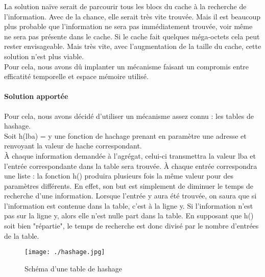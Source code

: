 \documentclass[a4paper,10pt]{article}
\begin{document}
La solution naïve serait de parcourir tous les blocs du cache à la recherche de l'information. Avec de la chance, elle serait très vite trouvée. Mais 
il est beaucoup plus probable que l'information ne sera pas immédiatement trouvée, voir même ne sera pas présente dans le cache. Si le cache fait quelques 
méga-octets cela peut rester envisageable. Mais très vite, avec l'augmentation de la taille du cache, cette solution n'est plus viable.\\
Pour cela, nous avons dû implanter un mécanisme faisant un compromis entre efficatité temporelle et espace mémoire utilisé. 

\paragraph{Solution apportée}
Pour cela, nous avons décidé d'utiliser un mécanisme assez connu : les tables de hashage.\\
Soit h(lba) = y une fonction de hachage prenant en paramètre une adresse et renvoyant la valeur de hache correspondant.\\
À chaque information demandée à l'agrégat, celui-ci transmettra la valeur lba et l'entrée correspondante dans la table sera trouvée. À chaque entrée 
correspondra une liste : la fonction h() produira plusieurs fois la même valeur pour des paramètres différents. En effet, son but est simplement de diminuer 
le temps de recherche d'une information. Lorsque l'entrée y aura été trouvée, on saura que si l'information est contenue dans la table, c'est à la ligne y. 
Si l'information n'est pas sur la ligne y, alors elle n'est nulle part dans la table. En supposant que h() soit bien "répartie", le temps de recherche est 
donc divisé par le nombre d'entrées de la table.
\begin{figure}[h]
\begin{center}
\texttt{[image: ./hashage.jpg]}
\caption{Schéma d'une table de hashage}
\end{center}
\end{figure}
\end{document}
